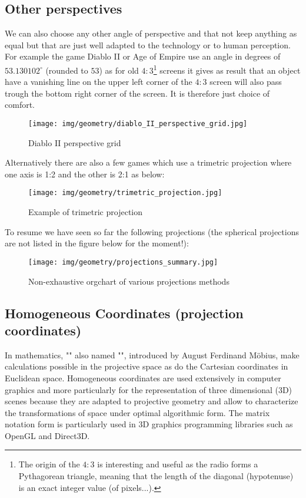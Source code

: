 	\subsection{Other perspectives}
	We can also choose any other angle of perspective and that not keep anything as equal but that are just well adapted to the technology or to human perception. For example the game Diablo II or Age of Empire use an angle in degrees of $53.130102^\circ$ (rounded to $53$) as for old $4:3$\footnote{The origin of the $4:3$ is interesting and useful as the radio forms a Pythagorean triangle, meaning that the length of the diagonal (hypotenuse) is an exact integer value (of pixels...).} screens it gives as result that an object have a vanishing line on the upper left corner of the $4:3$ screen will also pass trough the bottom right corner of the screen. It is therefore just choice of comfort.
	\begin{figure}[H]
		\centering
		\texttt{[image: img/geometry/diablo\_II\_perspective\_grid.jpg]}
		\caption[]{Diablo II perspective grid}
	\end{figure}
	Alternatively there are also a few games which use a trimetric projection where one axis is 1:2 and the other is 2:1 as below:
	\begin{figure}[H]
		\centering
		\texttt{[image: img/geometry/trimetric\_projection.jpg]}
		\caption[]{Example of trimetric projection}
	\end{figure}
	To resume we have seen so far the following projections (the spherical projections are not listed in the figure below for the moment!):
	\begin{figure}[H]
		\centering
		\texttt{[image: img/geometry/projections\_summary.jpg]}
		\caption{Non-exhaustive orgchart of various projections methods}
	\end{figure}
	
	\subsection{Homogeneous Coordinates (projection coordinates)}
	In mathematics, "\label{homogeneous coordinates}" also named "", introduced by August Ferdinand Möbius, make calculations possible in the projective space as do the Cartesian coordinates in Euclidean space. Homogeneous coordinates are used extensively in computer graphics and more particularly for the representation of three dimensional (3D) scenes  because they are adapted to projective geometry and allow to characterize the transformations of space under optimal algorithmic form. The matrix notation form is particularly used in 3D graphics programming  libraries such as OpenGL and Direct3D.

